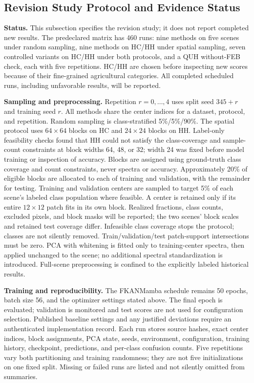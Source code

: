 \documentclass{revision_assets/ieeeaccess_revision}
\newif\ifrevisionhighlights
\newenvironment{revision}{\ifrevisionhighlights\begin{shaded*}\fi}{\ifrevisionhighlights\end{shaded*}\fi}
\begin{document}
\subsection{Revision Study Protocol and Evidence Status}
\label{sec:revision_protocol}
\begin{revision}
\textbf{Status.} This subsection specifies the revision study; it does not report completed new results. The predeclared matrix has 460 runs: nine methods on five scenes under random sampling, nine methods on HC/HH under spatial sampling, seven controlled variants on HC/HH under both protocols, and a QUH without-FEB check, each with five repetitions. HC/HH are chosen before inspecting new scores because of their fine-grained agricultural categories. All completed scheduled runs, including unfavorable results, will be reported.

\textbf{Sampling and preprocessing.} Repetition $r=0,\ldots,4$ uses split seed $345+r$ and training seed $r$. All methods share the center indices for a dataset, protocol, and repetition. Random sampling is class-stratified 5\%/5\%/90\%. The spatial protocol uses $64\times64$ blocks on HC and $24\times24$ blocks on HH. Label-only feasibility checks found that HH could not satisfy the class-coverage and sample-count constraints at block widths 64, 48, or 32; width 24 was fixed before model training or inspection of accuracy. Blocks are assigned using ground-truth class coverage and count constraints, never spectra or accuracy. Approximately 20\% of eligible blocks are allocated to each of training and validation, with the remainder for testing. Training and validation centers are sampled to target 5\% of each scene's labeled class population where feasible. A center is retained only if its entire $12\times12$ patch fits in its own block. Realized fractions, class counts, excluded pixels, and block masks will be reported; the two scenes' block scales and retained test coverage differ. Infeasible class coverage stops the protocol; classes are not silently removed. Train/validation/test patch-support intersections must be zero. PCA with whitening is fitted only to training-center spectra, then applied unchanged to the scene; no additional spectral standardization is introduced. Full-scene preprocessing is confined to the explicitly labeled historical results.

\textbf{Training and reproducibility.} The FKANMamba schedule remains 50 epochs, batch size 56, and the optimizer settings stated above. The final epoch is evaluated; validation is monitored and test scores are not used for configuration selection. Published baseline settings and any justified deviations require an authenticated implementation record. Each run stores source hashes, exact center indices, block assignments, PCA state, seeds, environment, configuration, training history, checkpoint, predictions, and per-class confusion counts. Five repetitions vary both partitioning and training randomness; they are not five initializations on one fixed split. Missing or failed runs are listed and not silently omitted from summaries.


\end{revision}
\end{document}
